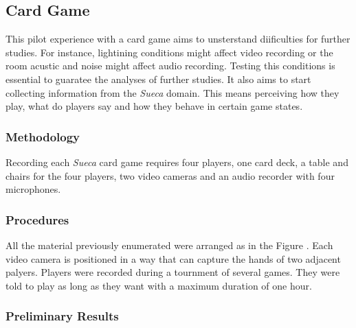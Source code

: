 \subsection{Card Game}
This pilot experience with a card game aims to unsterstand diificulties for further studies.
For instance, lightining conditions might affect video recording or the room acustic and noise might affect audio recording.
Testing this conditions is essential to guaratee the analyses of further studies.
It also aims to start collecting information from the \emph{Sueca} domain.
This means perceiving how they play, what do players say and how they behave in certain game states.

\subsubsection{Methodology}
Recording each \emph{Sueca} card game requires four players, one card deck, a table and chairs for the four players, two video cameras and an audio recorder with four microphones.

\subsubsection{Procedures}
All the material previously enumerated were arranged as in the Figure .
Each video camera is positioned in a way that can capture the hands of two adjacent palyers.
Players were recorded during a tournment of several games.
They were told to play as long as they want with a maximum duration of one hour.

\subsubsection{Preliminary Results}








